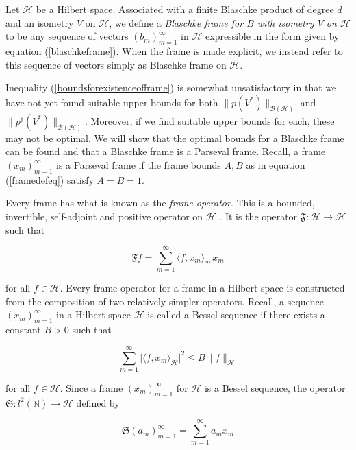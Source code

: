 \documentclass[10pt, reqno]{amsart}
\theoremstyle{definition}
\numberwithin{equation}{section}
\begin{document}
Let $\mathcal{H}$ be a Hilbert space. Associated with a finite Blaschke product of degree $d$ and an isometry $V$ on $\mathcal{H}$, we define a {\it{Blaschke frame for $B$ with isometry $V$ on $\mathcal{H}$}} to be any sequence of vectors $(b_{m})_{m=1}^{\infty}$ in $\mathcal{H}$ expressible in the form given by equation (\ref{blaschkeframe}). When the frame is made explicit, we instead refer to this sequence of vectors simply as Blaschke frame on $\mathcal{H}$. 

Inequality (\ref{boundsforexistenceofframe}) is somewhat unsatisfactory in that we have not yet found suitable upper bounds for both $\|p(V^{*})\|_{\mathcal{B}(\mathcal{H})}$ and $\|p^{\dagger}(V^{*})\|_{\mathcal{B}(\mathcal{H})}$. Moreover, if we find suitable upper bounds for each, these may not be optimal. We will show that the optimal bounds for a Blaschke frame can be found and that a Blaschke frame is a Parseval frame. Recall, a frame $(x_{m})_{m=1}^{\infty}$ is a Parseval frame if the frame bounds $A,B$ as in equation (\ref{framedefeq}) satisfy $A=B=1$.

Every frame has what is known as the {\it{frame operator}}. This is a bounded, invertible, self-adjoint and positive operator on $\mathcal{H}$ \cite[Lemma 5.1.5]{Christensen}. It is the operator $\mathfrak{F}:\mathcal{H}\rightarrow \mathcal{H}$ such that

\begin{equation}\label{frameoperatordef}
\mathfrak{F}f=\sum_{m=1}^{\infty}\langle f,x_{m}\rangle_{\mathcal{H}}x_{m}
\end{equation}

\noindent for all $f\in\mathcal{H}$. Every frame operator for a frame in a Hilbert space is constructed from the composition of two relatively simpler operators. Recall, a sequence $(x_{m})_{m=1}^{\infty}$ in a Hilbert space $\mathcal{H}$ is called a Bessel sequence if there exists a constant $B>0$ such that 

\begin{equation}\label{besselsequencedef}
\sum_{m=1}^{\infty}\lvert \langle f,x_{m}\rangle_{\mathcal{H}}\rvert^{2}\leq B\|f\|_{\mathcal{H}}
\end{equation}
    
\noindent for all $f\in\mathcal{H}$. Since a frame $(x_{m})_{m=1}^{\infty}$ for $\mathcal{H}$ is a Bessel sequence, the operator $\mathfrak{S}:l^{2}(\mathbb{N})\rightarrow\mathcal{H}$ defined by

$$ \mathfrak{S}(a_{m})_{m=1}^{\infty}=\sum_{m=1}^{\infty}a_{m}x_{m}$$
\end{document}
